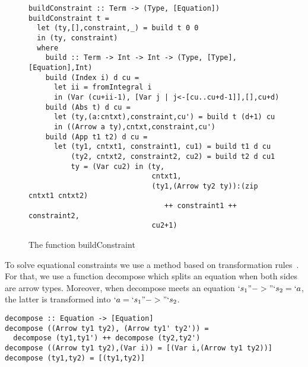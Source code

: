 \documentclass{jfp1}
\begin{document}
\begin{figure}[!btph]
  \centering
  \begin{normalsize}
\begin{verbatim}
buildConstraint :: Term -> (Type, [Equation])
buildConstraint t = 
  let (ty,[],constraint,_) = build t 0 0 
  in (ty, constraint)
  where
    build :: Term -> Int -> Int -> (Type, [Type], [Equation],Int)
    build (Index i) d cu = 
      let ii = fromIntegral i 
      in (Var (cu+ii-1), [Var j | j<-[cu..cu+d-1]],[],cu+d)
    build (Abs t) d cu = 
      let (ty,(a:cntxt),constraint,cu') = build t (d+1) cu 
      in ((Arrow a ty),cntxt,constraint,cu')
    build (App t1 t2) d cu = 
      let (ty1, cntxt1, constraint1, cu1) = build t1 d cu 
          (ty2, cntxt2, constraint2, cu2) = build t2 d cu1
          ty = (Var cu2) in (ty,
                             cntxt1,
                             (ty1,(Arrow ty2 ty)):(zip cntxt1 cntxt2) 
                                ++ constraint1 ++ constraint2, 
                             cu2+1)
\end{verbatim}
  \end{normalsize}
  \caption{The function \textsf{buildConstraint}}
\label{fig:bldcons}
\end{figure}
To solve equational constraints we use a method based on transformation
rules~\cite{GallierSnyderTCS89,JouannaudKirchner-rob91}. For that, we use a function
\textsf{decompose} which splits an equation when both sides are arrow types.
Moreover, when \textsf{decompose} meets an equation $`s_1 "->" `s_2 = `a$, the latter
is transformed into $`a = `s_1 "->" `s_2$.

\begin{verbatim}
decompose :: Equation -> [Equation]
decompose ((Arrow ty1 ty2), (Arrow ty1' ty2')) = 
  decompose (ty1,ty1') ++ decompose (ty2,ty2')
decompose ((Arrow ty1 ty2),(Var i)) = [(Var i,(Arrow ty1 ty2))]
decompose (ty1,ty2) = [(ty1,ty2)]
\end{verbatim}
\end{document}

